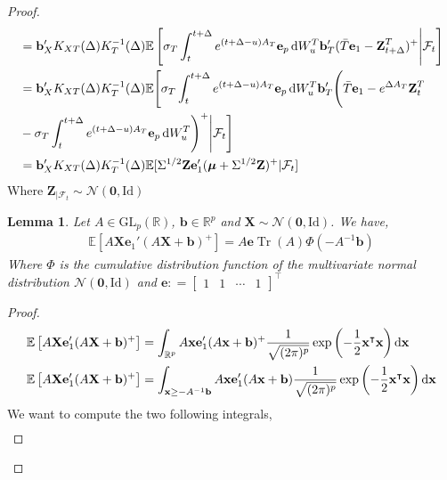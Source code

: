 \documentclass[10pt,a4paper,reqno]{amsart}
\newtheorem{lemma}[theorem]{Lemma}
\theoremstyle{example}
\DeclareMathOperator\Tr{Tr}
\newcommand{\Id}{\mathrm{Id}}
\newcommand*\D{\mathop{}\!\textnormal{d}}
\begin{document}
\begin{proof}
\begin{align}
    &=\mathbf{b}_X'  K_{XT}(\Delta)K_T^{-1}(\Delta)\mathbb{E}\left[\sigma_T \int_t^{t+\Delta} e^{(t+\Delta-u)A_T}\textbf{e}_p\D W_u^T\mathbf{b}_T'(\Bar{T}\textbf{e}_1-\textbf{Z}_{t+\Delta}^T)^+ \Bigg|\mathcal{F}_t\right]\nonumber\\
    &=\mathbf{b}_X'  K_{XT}(\Delta)K_T^{-1}(\Delta)\mathbb{E}\Bigg[\sigma_T \int_t^{t+\Delta} e^{(t+\Delta-u)A_T}\textbf{e}_p\D W_u^T\mathbf{b}_T'\Bigg(\Bar{T}\textbf{e}_1-e^{\Delta A_T}\textbf{Z}_{t}^T\nonumber\\
    &-\sigma_T\int_t^{t+\Delta} e^{(t+\Delta-u)A_T}\textbf{e}_p\D W_u^T\Bigg)^+ \Bigg|\mathcal{F}_t\Bigg]\nonumber\\
    &=\mathbf{b}_X'  K_{XT}(\Delta)K_T^{-1}(\Delta)\mathbb{E}[\Sigma^{1/2}\textbf{Z}\textbf{e}_1'(\boldsymbol{\mu}+\Sigma^{1/2}\textbf{Z})^+|\mathcal{F}_t]\nonumber
\end{align}
\noindent
Where $\textbf{Z}_{|\mathcal{F}_t}\sim\mathcal{N}(\textbf{0},\Id)$
\begin{lemma}
    Let $A\in\text{GL}_p(\mathbb{R})$, $\mathbf{b}\in\mathbb{R}^p$ and $\textbf{X}\sim\mathcal{N}(\textbf{0},\Id)$. We have,
    \begin{align}
        \mathbb{E}\left[A\textbf{X}\textbf{e}_1'(A\textbf{X}+\mathbf{b})^+\right]=A\mathbf{e}\Tr{(A)}\Phi(-A^{-1}\mathbf{b})\nonumber
    \end{align}
    Where $\Phi$ is the cumulative distribution function of the multivariate normal distribution $\mathcal{N}(\textbf{0},\Id)$ and $\mathbf{e}: = \begin{bmatrix} 1 & 1 & \cdots & 1 \end{bmatrix}^\intercal$
\end{lemma}
\noindent
\begin{proof}
    \begin{align}
        &\mathbb{E}\left[A\textbf{X}\textbf{e}_1'(A\textbf{X}+\mathbf{b})^+\right]=\int_{\mathbb{R}^p}A\textbf{x}\textbf{e}_1'(A\textbf{x}+\mathbf{b})^+\frac{1}{\sqrt{(2\pi)^p}}\exp{\left(-\frac{1}{2}\textbf{x}^\intercal\textbf{x}\right)}\D \textbf{x}\nonumber\\
        &\mathbb{E}\left[A\textbf{X}\textbf{e}_1'(A\textbf{X}+\mathbf{b})^+\right]=\int_{\textbf{x}\geq -A^{-1}\mathbf{b}}A\textbf{x}\textbf{e}_1'(A\textbf{x}+\mathbf{b})\frac{1}{\sqrt{(2\pi)^p}}\exp{\left(-\frac{1}{2}\textbf{x}^\intercal\textbf{x}\right)}\D \textbf{x}\nonumber
    \end{align}
    \noindent
    We want to compute the two following integrals,
    \begin{align}

\end{align}
\end{proof}
\end{proof}
\end{document}
